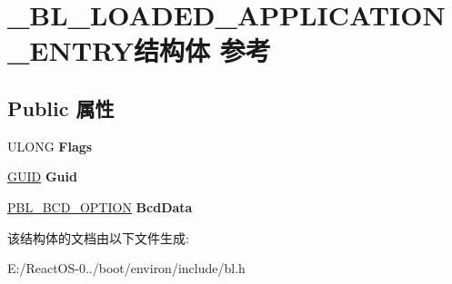 \hypertarget{struct___b_l___l_o_a_d_e_d___a_p_p_l_i_c_a_t_i_o_n___e_n_t_r_y}{}\section{\+\_\+\+B\+L\+\_\+\+L\+O\+A\+D\+E\+D\+\_\+\+A\+P\+P\+L\+I\+C\+A\+T\+I\+O\+N\+\_\+\+E\+N\+T\+R\+Y结构体 参考}
\label{struct___b_l___l_o_a_d_e_d___a_p_p_l_i_c_a_t_i_o_n___e_n_t_r_y}
\subsection*{Public 属性}
\begin{DoxyCompactItemize}
\item 
\mbox{\label{struct___b_l___l_o_a_d_e_d___a_p_p_l_i_c_a_t_i_o_n___e_n_t_r_y_a2773af8dd75fdac955f1f18ffeb3a22e}} 
U\+L\+O\+NG {\bfseries Flags}
\item 
\mbox{\label{struct___b_l___l_o_a_d_e_d___a_p_p_l_i_c_a_t_i_o_n___e_n_t_r_y_aa61c3548d8c1c293f48eb684398db774}} 
\hyperlink{interface_g_u_i_d}{G\+U\+ID} {\bfseries Guid}
\item 
\mbox{\label{struct___b_l___l_o_a_d_e_d___a_p_p_l_i_c_a_t_i_o_n___e_n_t_r_y_aa01e7a360a50e11f9e549820cf228483}} 
\hyperlink{struct___b_l___b_c_d___o_p_t_i_o_n}{P\+B\+L\+\_\+\+B\+C\+D\+\_\+\+O\+P\+T\+I\+ON} {\bfseries Bcd\+Data}
\end{DoxyCompactItemize}


该结构体的文档由以下文件生成\+:\begin{DoxyCompactItemize}
\item 
E\+:/\+React\+O\+S-\/0../boot/environ/include/bl.\+h\end{DoxyCompactItemize}
